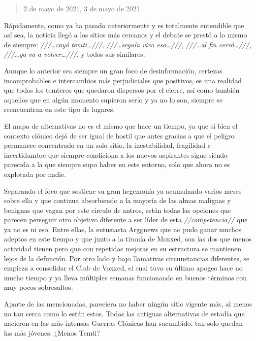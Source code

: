 \documentclass[
  spanish,
]{book}
\begin{document}
\begin{quote}
2 de mayo de 2021, 3 de mayo de 2021
\end{quote}

Rápidamente, como ya ha pasado anteriormente y es totalmente entendible que así sea, la noticia llegó a los sitios más cercanos y el debate se prestó a lo mismo de siempre: \emph{///\ldots cayó temti\ldots///}, \emph{///\ldots seguía vivo eso\ldots///}, \emph{///\ldots al fin cerró\ldots///}, \emph{///\ldots ya va a volver\ldots///}, y todos sus similares.

Aunque lo anterior sea siempre un gran foco de desinformación, certezas incomprobables e intercambios más perjudiciales que positivos, es una realidad que todos los temteros que quedaron dispersos por el cierre, así como también aquellos que en algún momento supieron serlo y ya no lo son, siempre se reencuentran en este tipo de lugares.

El mapa de alternativas no es el mismo que hace un tiempo, ya que si bien el contexto clónico dejó de ser igual de hostil que antes gracias a que el peligro permanece concentrado en un solo sitio, la inestabilidad, fragilidad e incertidumbre que siempre condiciona a los nuevos aspirantes sigue siendo parecida a la que siempre supo haber en este entorno, solo que ahora no es explotada por nadie.

Separando el foco que sostiene su gran hegemonía ya acumulando varios meses sobre ella y que continua absorbiendo a la mayoría de las almas malignas y benignas que vagan por este circulo de antros, están todas las opciones que parecen perseguir otro objetivo diferente a ser líder de esta \emph{//competencia//} que ya no es ni eso. Entre ellas, la entusiasta Arggnews que no pudo ganar muchos adeptos en este tiempo y que junto a la tiranía de Moxxed, son las dos que menos actividad tienen pero que con repetidas mejoras en su estructura se mantienen lejos de la defunción. Por otro lado y bajo llamativas circunstancias diferentes, se empieza a consolidar el Club de Voxxed, el cual tuvo su último apogeo hace no mucho tiempo y ya lleva múltiples semanas funcionando en buenos términos con muy pocos sobresaltos.

Aparte de las mencionadas, pareciera no haber ningún sitio vigente más, al menos no tan cerca como lo están estos. Todas las antiguas alternativas de estadía que nacieron en las más intensas Guerras Clónicas han sucumbido, tan solo quedan las más jóvenes. ¿Menos Temti?
\end{document}
